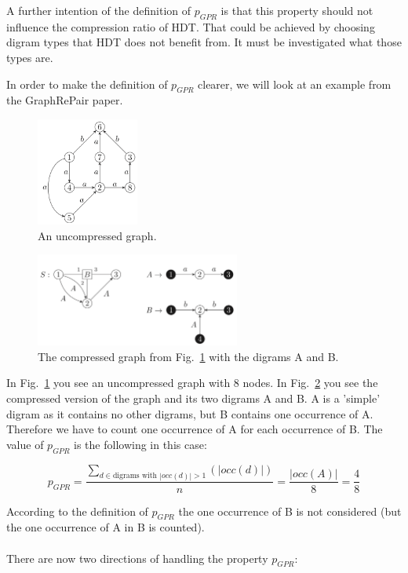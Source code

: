 \documentclass[a4paper]{scrartcl}
\begin{document}
\begin{itemize}
A further intention of the definition of $p_{GPR}$ is that this property should not influence the compression ratio of HDT. That could be achieved by choosing digram types that HDT does not benefit from. It must be investigated what those types are.

In order to make the definition of $p_{GPR}$ clearer, we will look at an example from the GraphRePair paper.

\begin{figure}[h]
	\centering
	\includegraphics[width=0.3\textwidth]{img/uncompressed}
	\caption{An uncompressed graph.}
	\label{fig:uncompressed}
\end{figure}

\begin{figure}[h]
	\centering
	\includegraphics[width=0.6\textwidth]{img/compressed}
	\caption{The compressed graph from Fig.~\ref{fig:uncompressed} with the digrams A and B.}
	\label{fig:compressed}
\end{figure}

In Fig.~\ref{fig:uncompressed} you see an uncompressed graph with 8 nodes. In Fig.~\ref{fig:compressed} you see the compressed version of the graph and its two digrams A and B. A is a 'simple' digram as it contains no other digrams, but B contains one occurrence of A. Therefore we have to count one occurrence of A for each occurrence of B. The value of $p_{GPR}$ is the following in this case:

\[
p_{GPR}= \dfrac{\sum_{d \in \text{digrams with } |occ(d)|>1} (|occ(d)|) }{n} = \dfrac{|occ(A)|}{8} = \dfrac{4}{8}
\]

According to the definition of $p_{GPR}$ the one occurrence of B is not considered (but the one occurrence of A in B is counted).
\\\\
There are now two directions of handling the property $p_{GPR}$:


\end{itemize}
\end{document}
